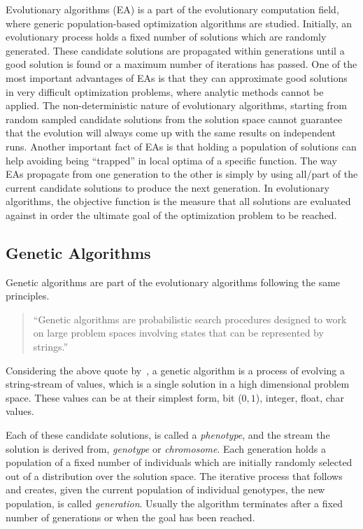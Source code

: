 Evolutionary algorithms (EA) is a part of the evolutionary computation field, where generic population-based optimization algorithms are studied. Initially, an evolutionary process holds a fixed number of solutions which are randomly generated. These candidate solutions are propagated within generations until a good solution is found or a maximum number of iterations has passed. One of the most important advantages of EAs is that they can approximate good solutions in very difficult optimization problems, where analytic methods cannot be applied. The non-deterministic nature of evolutionary algorithms, starting from random sampled candidate solutions from the solution space cannot guarantee that the evolution will always come up with the same results on independent runs. Another important fact of EAs is that holding a population of solutions can help avoiding being ``trapped'' in local optima of a specific function. The way EAs propagate from one generation to the other is simply by using all/part of the current candidate solutions to produce the next generation. In evolutionary algorithms, the objective function is the measure that all solutions are evaluated against in order the ultimate goal of the optimization problem to be reached.




\subsection{Genetic Algorithms}
Genetic algorithms are part of the evolutionary algorithms following the same principles.

\begin{quote}``Genetic algorithms are probabilistic search procedures designed to work on
large problem spaces involving states that can be represented by strings.''\end{quote}

Considering the above quote by~\citep{goldberg1988genetic}, a genetic algorithm is a process of evolving a string-stream of values, which is a single solution in a high dimensional problem space. These values can be at their simplest form, bit ($0, 1$), integer, float, char values.

Each of these candidate solutions, is called a \emph{phenotype}, and the stream the solution is derived from, \emph{genotype} or \emph{chromosome}. Each generation holds a population of a fixed number of individuals which are initially randomly selected out of a distribution over the solution space. The iterative process that follows and creates, given the current population of individual genotypes, the new population, is called \emph{generation}. Usually the algorithm terminates after a fixed number of generations or when the goal has been reached. 

